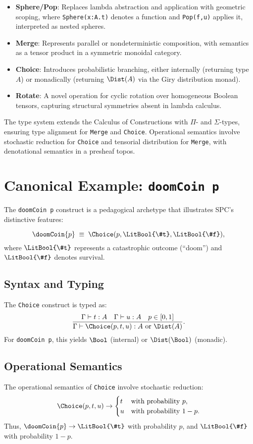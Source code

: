 \documentclass{article}
\begin{document}
\begin{itemize}
    \item \textbf{Sphere/Pop}: Replaces lambda abstraction and application with geometric scoping, where \texttt{Sphere(x:A.t)} denotes a function and \texttt{Pop(f,u)} applies it, interpreted as nested spheres.
    \item \textbf{Merge}: Represents parallel or nondeterministic composition, with semantics as a tensor product in a symmetric monoidal category.
    \item \textbf{Choice}: Introduces probabilistic branching, either internally (returning type $A$) or monadically (returning $\Dist(A)$ via the Giry distribution monad).
    \item \textbf{Rotate}: A novel operation for cyclic rotation over homogeneous Boolean tensors, capturing structural symmetries absent in lambda calculus.
\end{itemize}

The type system extends the Calculus of Constructions with $\Pi$- and $\Sigma$-types, ensuring type alignment for \texttt{Merge} and \texttt{Choice}. Operational semantics involve stochastic reduction for \texttt{Choice} and tensorial distribution for \texttt{Merge}, with denotational semantics in a presheaf topos.

\section{Canonical Example: \texttt{doomCoin p}}
The \texttt{doomCoin p} construct is a pedagogical archetype that illustrates SPC’s distinctive features:

\begin{equation}
\doomCoin{p} \;\equiv\; \Choice(p, \LitBool{\#t}, \LitBool{\#f}),
\end{equation}
where $\LitBool{\#t}$ represents a catastrophic outcome (``doom'') and $\LitBool{\#f}$ denotes survival.

\subsection{Syntax and Typing}
The \texttt{Choice} construct is typed as:
\[
\frac{\Gamma \vdash t : A \quad \Gamma \vdash u : A \quad p \in [0,1]}{\Gamma \vdash \Choice(p, t, u) : A \text{ or } \Dist(A)}.
\]
For \texttt{doomCoin p}, this yields $\Bool$ (internal) or $\Dist(\Bool)$ (monadic).

\subsection{Operational Semantics}
The operational semantics of \texttt{Choice} involve stochastic reduction:
\[
\Choice(p, t, u) \to \begin{cases} t & \text{with probability } p, \\ u & \text{with probability } 1-p. \end{cases}
\]
Thus, $\doomCoin{p} \to \LitBool{\#t}$ with probability $p$, and $\LitBool{\#f}$ with probability $1-p$.
\end{document}
